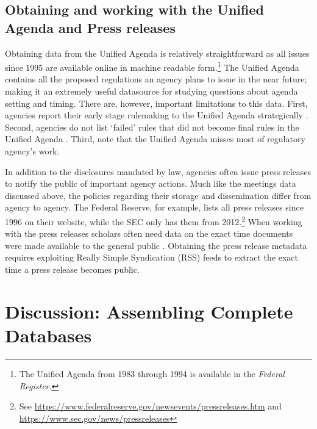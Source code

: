 \documentclass[12pt,notitlepage]{article}
\begin{document}
\hypertarget{obtaining-and-working-with-the-unified-agenda-and-press-releases}{%
\subsection*{Obtaining and working with the Unified Agenda and Press
releases}\label{obtaining-and-working-with-the-unified-agenda-and-press-releases}}

Obtaining data from the Unified Agenda is relatively straightforward as
all issues since 1995 are available online in machine readable
form.\footnote{The Unified Agenda from 1983 through 1994 is available in
  the \emph{Federal Register}.} The Unified Agenda contains all the
proposed regulations an agency plans to issue in the near future; making
it an extremely useful datasource for studying questions about agenda
setting and timing. There are, however, important limitations to this
data. First, agencies report their early stage rulemaking to the Unified
Agenda strategically \citep{Nou_SCLR_2016}. Second, agencies do not list
`failed' rules that did not become final rules in the Unified Agenda
\citep{Yackee_GWLR_2012}. Third, \citet{Coglianese_ALR_2016} note that
the Unified Agenda misses most of regulatory agency's work.

In addition to the disclosures mandated by law, agencies often issue
press releases to notify the public of important agency actions. Much
like the meetings data discussed above, the policies regarding their
storage and dissemination differ from agency to agency. The Federal
Reserve, for example, lists all press releases since 1996 on their
website, while the SEC only has them from 2012.\footnote{See
  \url{https://www.federalreserve.gov/newsevents/pressreleases.htm} and
  \url{https://www.sec.gov/news/pressreleases}} When working with the
press releases scholars often need data on the exact time documents were
made available to the general public \citep[see e.g.,][]{Libgober_JOP}.
Obtaining the press release metadata requires exploiting Really Simple
Syndication (RSS) feeds to extract the exact time a press release
becomes public.

\hypertarget{discussion-assembling-complete-databases}{%
\section{Discussion: Assembling Complete
Databases}\label{discussion-assembling-complete-databases}}
\end{document}
